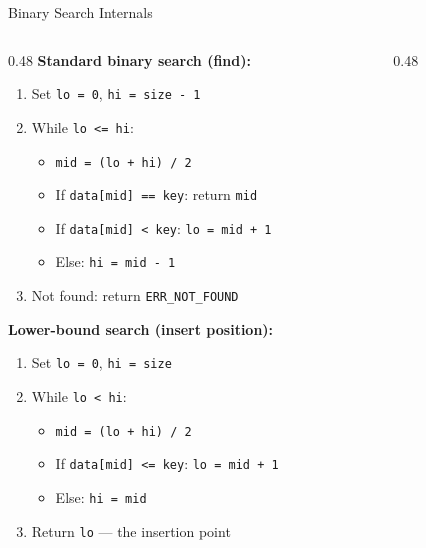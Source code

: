 \documentclass[aspectratio=169, 10pt]{beamer}
\begin{document}
\begin{frame}{Binary Search Internals}
\begin{columns}[T]
\begin{column}{0.48\textwidth}
\textbf{Standard binary search (find):}
\begin{enumerate}
  \item Set \texttt{lo = 0}, \texttt{hi = size - 1}
  \item While \texttt{lo <= hi}:
  \begin{itemize}
    \item \texttt{mid = (lo + hi) / 2}
    \item If \texttt{data[mid] == key}: return \texttt{mid}
    \item If \texttt{data[mid] < key}: \texttt{lo = mid + 1}
    \item Else: \texttt{hi = mid - 1}
  \end{itemize}
  \item Not found: return \texttt{ERR\_NOT\_FOUND}
\end{enumerate}

\vspace{0.5em}
\textbf{Lower-bound search (insert position):}
\begin{enumerate}
  \item Set \texttt{lo = 0}, \texttt{hi = size}
  \item While \texttt{lo < hi}:
  \begin{itemize}
    \item \texttt{mid = (lo + hi) / 2}
    \item If \texttt{data[mid] <= key}: \texttt{lo = mid + 1}
    \item Else: \texttt{hi = mid}
  \end{itemize}
  \item Return \texttt{lo} --- the insertion point
\end{enumerate}
\end{column}

\begin{column}{0.48\textwidth}
\begin{center}
\end{center}
\end{column}
\end{columns}
\end{frame}
\end{document}
